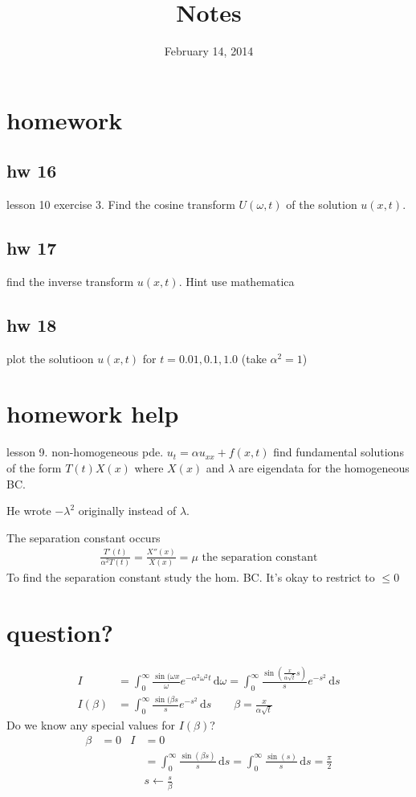 \documentclass{article}
\begin{document}
\title{Notes}
\date{February 14, 2014}
\maketitle
\section*{homework}
\subsection*{hw 16}
lesson 10 exercise 3. Find the cosine transform $U(\omega ,t)$ of the solution $u(x,t)$.
\subsection*{hw 17}
find the inverse transform $u(x,t)$. Hint use mathematica
\subsection*{hw 18}
plot the solutioon $u(x,t)$ for $t=0.01,0.1,1.0$ (take $\alpha ^2=1$)
\section*{homework help}
lesson 9. non-homogeneous pde. $u_t=\alpha u_{xx}+f(x,t)$ find fundamental solutions of the form $T(t)X(x)$ where $X(x)$ and $\lambda $ are eigendata for the homogeneous BC.

He wrote $-\lambda ^2$ originally instead of $\lambda $.

The separation constant occurs
\begin{align*}
  \frac{T'(t)}{\alpha ^2T(t)}=\frac{X''(x)}{X(x)}=\mu \text{ the separation constant}
\end{align*}
To find the separation constant study the hom. BC. It's okay to restrict to $\leq 0$

\section*{question?}
\begin{align*}
  I&=\int_0^\infty{\frac{\sin(\omega x}{\omega }e^{-\alpha ^2\omega ^2t}\,\mathrm{d}\omega }=\int_0^\infty{\frac{\sin(\frac{x}{\alpha \sqrt{t}}s)}{s}e^{-s^2}\,\mathrm{d}s}\\
  I(\beta)&=\int_0^\infty{\frac{\sin(\beta s}{s}e^{-s^2}\,\mathrm{d}s}\qquad\beta =\frac{x}{\alpha \sqrt{t}}
\end{align*}
Do we know any special values for $I(\beta)$?
\begin{align*}
  \beta &=0&I&=0\\
  &&&=\int_0^\infty{\frac{\sin(\beta s)}{s}\,\mathrm{d}s}=\int_0^\infty{\frac{\sin(s)}{s}\,\mathrm{d}s}=\frac{\pi }{2}\\
  &&&s\gets\frac{s}{\beta }
\end{align*}
\end{document}
